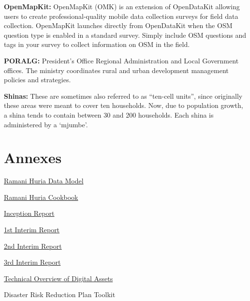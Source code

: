 \documentclass[a4paper,12pt,twoside]{article}
\begin{document}
\textbf{OpenMapKit:} OpenMapKit (OMK) is an extension of OpenDataKit allowing users to create professional-quality mobile data collection surveys for field data collection. OpenMapKit launches directly from OpenDataKit when the OSM question type is enabled in a standard survey. Simply include OSM questions and tags in your survey to collect information on OSM in the field.


\textbf{PORALG:} President's Office Regional Administration and Local Government offices. The ministry coordinates rural and urban development management policies and strategies.


\textbf{Shinas:} These are sometimes also referred to as “ten-cell units”, since originally these areas were meant to cover ten households. Now, due to population growth, a shina tends to contain between 30 and 200 households. Each shina is administered by a ‘mjumbe’.

\section{Annexes}
\href{https://wiki.openstreetmap.org/wiki/Dar_es_Salaam/Ramani_Huria}{Ramani Huria Data Model}

\href{https://drive.google.com/file/d/1M0jcJHxdIDlrCRr09c4G8ZVlvl43j_1b/view}{Ramani Huria Cookbook}

\href{https://docs.google.com/document/d/1PwHRtdRvOfeEhpsIl-gpQXTTDoVwW_0--wRsmeUhVt4/edit#}{Inception Report}

\href{https://docs.google.com/document/d/1oW4y4ZT76viHu_sDnrBYrFsJfu_a0CAn9GLIxmG_rpc/edit}{1st Interim Report}

\href{https://docs.google.com/document/d/1Zn35NGLn2n-X93Z2hwiWwQwUnMljCoD7hwTUrTEXxTg/edit}{2nd Interim Report}

\href{https://docs.google.com/document/d/1D03BG5Pkmo0XMIyrvvgVLqdeyfkmwxRRs3UQdekNspk/edit}{3rd Interim Report}

\href{https://docs.google.com/document/d/1Cc-ztcmc53LqlqhAXC1neCyxuRJujN16nhcibMg04qw/edit}{Technical Overview of Digital Assets}

Disaster Risk Reduction Plan Toolkit
\end{document}
